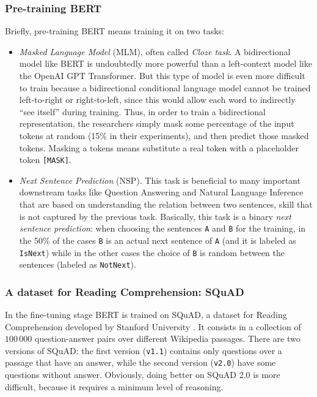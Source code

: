 \subsubsection{Pre-training BERT}
Briefly, pre-training BERT means training it on two tasks:
\begin{itemize}
  \item \textit{Masked Language Model} (MLM), often called \textit{Cloze task}. A bidirectional model like BERT is undoubtedly more powerful than a left-context model like the OpenAI GPT Transformer. But this type of model is even more difficult to train because a bidirectional conditional language model cannot be trained left-to-right or right-to-left, since this would allow each word to indirectly “see itself” during training. Thus, in order to train a bidirectional representation, the researchers simply mask some percentage of the input tokens at random (15\% in their experiments), and then predict those masked tokens. Masking a tokens means substitute a real token with a placeholder token \texttt{[MASK]}. 
  \item \textit{Next Sentence Prediction} (NSP). This task is beneficial to many important downstream tasks like Question Answering and Natural Language Inference that are based on understanding the relation between two sentences, skill that is not captured by the previous task. Basically, this task is a binary \textit{next sentence prediction}: when choosing the sentences \texttt{A} and \texttt{B} for the training, in the 50\% of the cases \texttt{B} is an actual next sentence of \texttt{A} (and it is labeled as \texttt{IsNext}) while in the other cases the choice of \texttt{B} is random between the sentences (labeled as \texttt{NotNext}).
\end{itemize}

\subsubsection{A dataset for Reading Comprehension: SQuAD}
In the fine-tuning stage BERT is trained on SQuAD, a dataset for Reading Comprehension developed by Stanford University \cite{squad}. It consists in a collection of $100\,000$ question-answer pairs over different Wikipedia passages. There are two versions of SQuAD: the first version (\texttt{v1.1}) contains only questions over a passage that have an answer, while the second version (\texttt{v2.0}) have some questions without answer. Obviously, doing better on SQuAD 2.0 is more difficult, because it requires a minimum level of reasoning.

